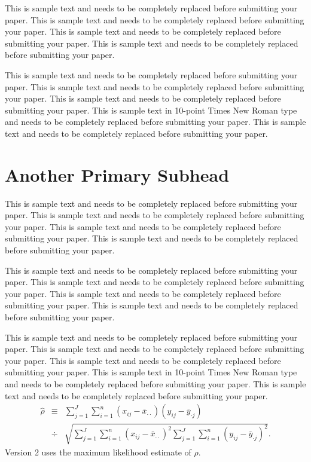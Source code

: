 \documentclass{asaproc}
\begin{document}
This is sample text and needs to be completely replaced before submitting your paper. This is sample text and needs to be completely replaced before submitting your paper.  This is sample text and needs to be completely replaced before submitting your paper. This is sample text and needs to be completely replaced before submitting your paper.

This is sample text and needs to be completely replaced before submitting your paper. This is sample text and needs to be completely replaced before submitting your paper. This is sample text and needs to be completely replaced before submitting your paper. This is sample text in 10-point Times New Roman type and needs to be completely replaced before submitting your paper. This is sample text and needs to be completely replaced before submitting your paper.

\section{Another Primary Subhead}

This is sample text and needs to be completely replaced before submitting your paper. This is sample text and needs to be completely replaced before submitting your paper. This is sample text and needs to be completely replaced before submitting your paper. This is sample text and needs to be completely replaced before submitting your paper.

This is sample text and needs to be completely replaced before submitting your paper. This is sample text and needs to be completely replaced before submitting your paper.  This is sample text and needs to be completely replaced before submitting your paper. This is sample text and needs to be completely replaced before submitting your paper.

This is sample text and needs to be completely replaced before submitting your paper. This is sample text and needs to be completely replaced before submitting your paper. This is sample text and needs to be completely replaced before submitting your paper. This is sample text in 10-point Times New Roman type and needs to be completely replaced before submitting your paper. This is sample text and needs to be completely replaced before submitting your paper.\begin{eqnarray}
\hat{\rho} & \equiv & \sum_{j=1}^J
\sum_{i=1}^n (x_{ij} - \bar{x}_{\cdot \cdot})(y_{ij} - \bar{y}_{\cdot
j}) \nonumber \\
& \div & \sqrt{
\sum_{j=1}^J \sum_{i=1}^n (x_{ij} - \bar{x}_{\cdot \cdot})^2
\sum_{j=1}^J \sum_{i=1}^n (y_{ij} - \bar{y}_{\cdot j})^2
}
. \nonumber
\end{eqnarray}
Version 2 uses the maximum likelihood estimate of $\rho$.
\end{document}
